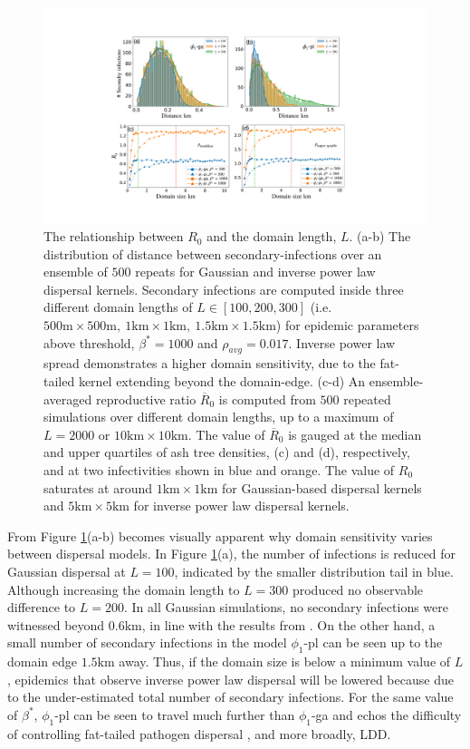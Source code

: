 \begin{figure}
    \centering
    \includegraphics[scale=0.42]{chapter6/figures/fig5-R0-domain-size.pdf}
    \caption{The relationship between $R_0$ and the domain length, $L$. (a-b) The distribution of distance between secondary-infections over an ensemble of $500$ repeats for Gaussian and inverse power law dispersal kernels.
    Secondary infections are computed inside three different domain lengths of $L \in [100, 200, 300]$ (i.e. $\mathrm{500m\times500m,\ 1km\times1km,\ 1.5km\times1.5km}$) for epidemic parameters above threshold, $\beta^*=1000$ and $\rho_{avg} = 0.017$. Inverse power law spread demonstrates a higher domain sensitivity, due to the fat-tailed kernel extending beyond the domain-edge. (c-d) An ensemble-averaged reproductive ratio $\overline{R}_0$ is computed from $500$ repeated simulations over different domain lengths, up to a maximum of $L=2000$ or $\mathrm{10km \times 10km}$. The value of $\overline{R}_0$ is gauged at the median and upper quartiles of ash tree densities, (c) and (d), respectively, and at two infectivities shown in blue and orange. The value of $R_0$ saturates at around $\mathrm{1km\times1km}$ for Gaussian-based dispersal kernels and $\mathrm{5km\times5 km}$ for inverse power law dispersal kernels.}
    
    \label{fig:r0-domain-size}
\end{figure}

From Figure \ref{fig:r0-domain-size}(a-b) becomes visually apparent why domain sensitivity varies between dispersal models.
In Figure \ref{fig:r0-domain-size}(a), the number of infections is reduced for Gaussian dispersal at $L=100$, indicated by the smaller distribution tail in blue.
Although increasing the domain length to $L=300$ produced no observable difference to $L=200$.
In all Gaussian simulations, no secondary infections were witnessed beyond $0.6\mathrm{km}$, in line with the results from \cite{grosdidier2018tracking}. 
On the other hand, a small number of secondary infections in the model $\phi_1$-pl can be seen up to the domain edge $1.5\mathrm{km}$ away.
Thus, if the domain size is below a minimum value of $L$, epidemics that observe inverse power law dispersal will be lowered because due to the under-estimated total number of secondary infections.
For the same value of $\beta^*$, $\phi_1$-pl can be seen to travel much further than $\phi_1$-ga and echos the difficulty of controlling fat-tailed pathogen dispersal \cite{WEBIDEMICS}, and more broadly, LDD.

